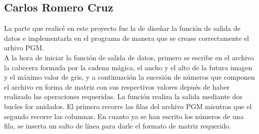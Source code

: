 \documentclass[a4paper, 11pt, spanish]{article}
\begin{document}
\subsection{Carlos Romero Cruz}

La parte que realicé en este proyecto fue la de diseñar la función de salida de datos e implementarla en el programa de manera que se crease correctamente el arhivo PGM.
\\

A la hora de iniciar la función de salida de datos, primero se escribe en el archivo la cabecera formada por la cadena mágica, el ancho y el alto de la futura imagen y el máximo valor de gris, y a continuación la sucesión de números que componen el archivo en forma de matriz con sus respectivos valores depués de haber realizado las operaciones requeridas. La función realiza la salida mediante dos bucles for anidados. El primero recorre las filas del archivo PGM mientras que el segundo recorre las columnas. En cuanto ya se han escrito los números de una fila, se inserta un salto de línea para darle el formato de matriz requerido.
\end{document}
